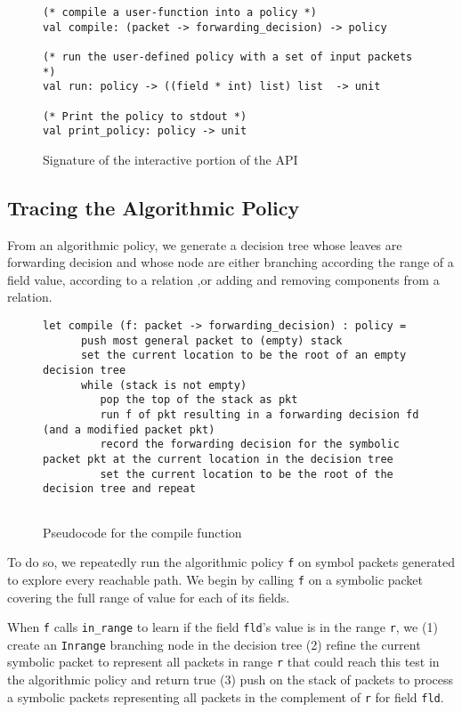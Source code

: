 \documentclass[11pt]{article}
\begin{document}
\begin{figure}
  \begin{lstlisting}
(* compile a user-function into a policy *)
val compile: (packet -> forwarding_decision) -> policy
    
(* run the user-defined policy with a set of input packets *)
val run: policy -> ((field * int) list) list  -> unit
    
(* Print the policy to stdout *)
val print_policy: policy -> unit
  \end{lstlisting}
  \label{fig:build_api}
  \caption{Signature of the interactive portion of the API}
\end{figure}

\subsection*{Tracing the Algorithmic Policy}
From an algorithmic policy, we generate a decision tree  whose leaves are forwarding decision and whose node are either branching according the range of a field value, according to a relation ,or adding and removing components from a relation.

\begin{figure}
\begin{lstlisting}
let compile (f: packet -> forwarding_decision) : policy =
      push most general packet to (empty) stack
      set the current location to be the root of an empty decision tree
      while (stack is not empty)
         pop the top of the stack as pkt
         run f of pkt resulting in a forwarding decision fd (and a modified packet pkt)
         record the forwarding decision for the symbolic packet pkt at the current location in the decision tree
         set the current location to be the root of the decision tree and repeat
  
\end{lstlisting}
\caption{Pseudocode for the compile function}
\end{figure}

To do so, we repeatedly run the algorithmic policy \lstinline|f| on symbol packets generated to explore every reachable path.
We begin by calling \lstinline|f| on a symbolic packet covering the full range of value for each of its fields.

When \lstinline|f| calls \lstinline|in_range| to learn if the field \lstinline|fld|'s value is in the range \lstinline|r|, we (1) create an \lstinline|Inrange| branching node in the decision tree (2) refine the current symbolic packet to represent all packets in range \lstinline|r| that could reach this test in the algorithmic policy and return true (3) push on the stack of packets to process a symbolic packets representing all packets in the complement of \lstinline|r| for field \lstinline|fld|.
\end{document}
